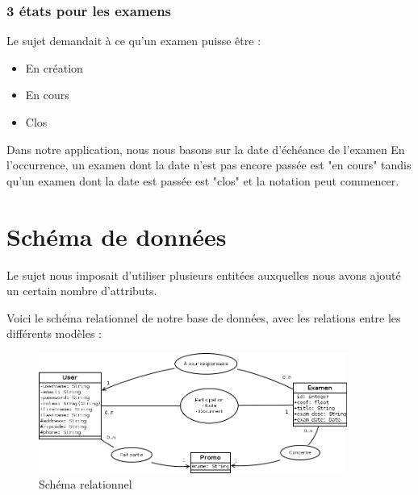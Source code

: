 \documentclass{report}
\begin{document}
        
      \subsubsection{3 états pour les examens}
        Le sujet demandait à ce qu'un examen puisse être :

        \begin{itemize}
          \item{En création}
          \item{En cours}
          \item{Clos}
        \end{itemize}

        Dans notre application, nous nous basons sur la date d'échéance de l'examen
        En l'occurrence, un examen dont la date n'est pas encore passée est "en cours"
        tandis qu'un examen dont la date est passée est "clos" et la notation peut commencer.
  	
  \section{Schéma de données}
    Le sujet nous imposait d'utiliser plusieurs entitées auxquelles nous avons 
    ajouté un certain nombre d'attributs.

    Voici le schéma relationnel de notre base de données, avec les relations entre les 
    différents modèles :
    \begin{figure}[!h]
      \includegraphics[width=0.9\textwidth]{./data.png}
      \caption{Schéma relationnel}
    \end{figure}
\end{document}
